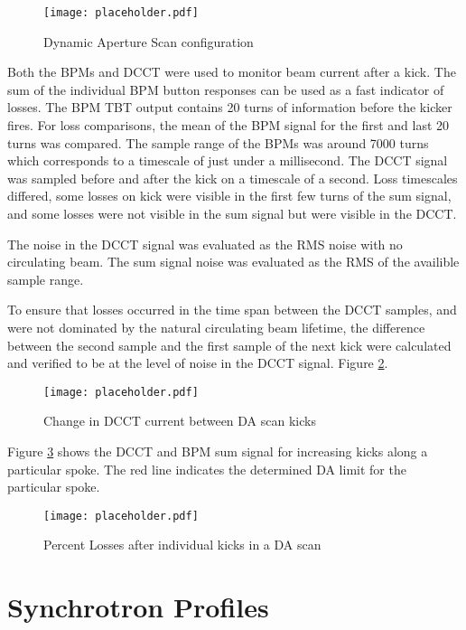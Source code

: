 \begin{figure}
	\centering
	\texttt{[image: placeholder.pdf]}
	\caption{Dynamic Aperture Scan configuration}
	\label{fig:spokes}
\end{figure}

Both the BPMs and DCCT were used to monitor beam current after a kick. The sum of the individual BPM button responses can be used as a fast indicator of losses. The BPM TBT output contains 20 turns of information before the kicker fires. For loss comparisons, the mean of the BPM signal for the first and last 20 turns was compared. The sample range of the BPMs was around 7000 turns which corresponds to a timescale of just under a millisecond. The DCCT signal was sampled before and after the kick on a timescale of a second. Loss timescales differed, some losses on kick were visible in the first few turns of the sum signal, and some losses were not visible in the sum signal but were visible in the DCCT. 

The noise in the DCCT signal was evaluated as the RMS noise with no circulating beam. The sum signal noise was evaluated as the RMS of the availible sample range.

To ensure that losses occurred in the time span between the DCCT samples, and were not dominated by the natural circulating beam lifetime, the difference between the second sample and the first sample of the next kick were calculated and verified to be at the level of noise in the DCCT signal. Figure \ref{fig:dcctKickLife}.


\begin{figure}
	\centering
	\texttt{[image: placeholder.pdf]}
	\caption{Change in DCCT current between DA scan kicks}
	\label{fig:dcctKickLife}
\end{figure}

Figure \ref{fig:daLimit} shows the DCCT and BPM sum signal for increasing kicks along a particular spoke. The red line indicates the determined DA limit for the particular spoke.

\begin{figure}
	\centering
	\texttt{[image: placeholder.pdf]}
	\caption{Percent Losses after individual kicks in a DA scan}
	\label{fig:daLimit}
\end{figure}

\section{Synchrotron Profiles} \label{sec:synchProfiles}
